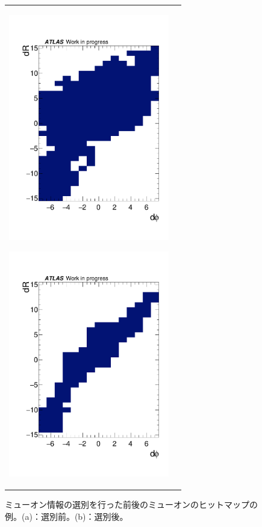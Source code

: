 \begin{figure}[tb]
    \begin{tabular}{cc}
    \centering
    \begin{minipage}[b]{0.45\hsize}%
        \centering
        \hspace*{-1cm}
        \includegraphics[clip, width=7cm]{fig/4/data_phi4_roi53_before.pdf}
        \subcaption{}
        \label{4-53be}
    \end{minipage}%
    \begin{minipage}[b]{0.6\hsize}%
        \centering
        \hspace*{-1cm}
        \includegraphics[clip, width=7cm]{fig/4/data_phi4_roi53_after.pdf}
        \subcaption{}
        \label{4-53af}
    \end{minipage}%
    \end{tabular}
    \caption{ミューオン情報の選別を行った前後のミューオンのヒットマップの例。(a)：選別前。(b)：選別後。}
    \label{fig:hitmapcleaner}
\end{figure}


